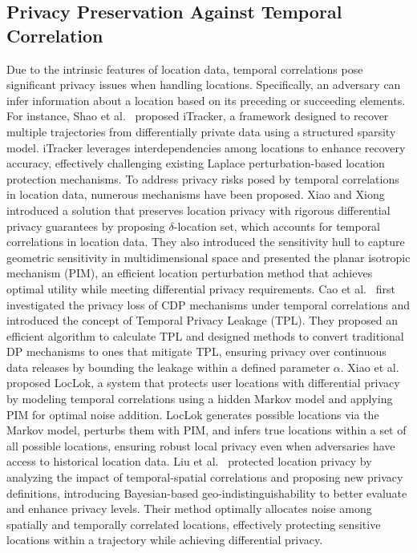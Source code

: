 \subsection{Privacy Preservation Against Temporal Correlation}
Due to the intrinsic features of location data, temporal correlations pose significant privacy issues when handling locations. Specifically, an adversary can infer information about a location based on its preceding or succeeding elements. For instance, Shao et al.~\cite{shao2020structured} proposed iTracker, a framework designed to recover multiple trajectories from differentially private data using a structured sparsity model. iTracker leverages interdependencies among locations to enhance recovery accuracy, effectively challenging existing Laplace perturbation-based location protection mechanisms.
To address privacy risks posed by temporal correlations in location data, numerous mechanisms have been proposed.
Xiao and Xiong~\cite{xiao2015protecting} introduced a solution that preserves location privacy with rigorous differential privacy guarantees by proposing $\delta$-location set, which accounts for temporal correlations in location data. They also introduced the sensitivity hull to capture geometric sensitivity in multidimensional space and presented the planar isotropic mechanism (PIM), an efficient location perturbation method that achieves optimal utility while meeting differential privacy requirements.
Cao et al.~\cite{cao2017quantifying} first investigated the privacy loss of CDP mechanisms under temporal correlations and introduced the concept of Temporal Privacy Leakage (TPL). They proposed an efficient algorithm to calculate TPL and designed methods to convert traditional DP mechanisms to ones that mitigate TPL, ensuring privacy over continuous data releases by bounding the leakage within a defined parameter $\alpha$.
Xiao et al.~\cite{xiao2017loclok} proposed LocLok, a system that protects user locations with differential privacy  by modeling temporal correlations using a hidden Markov model and applying PIM for optimal noise addition. LocLok generates possible locations via the Markov model, perturbs them with PIM, and infers true locations within a set of all possible locations, ensuring robust local privacy even when adversaries have access to historical location data.
Liu et al.~\cite{liu2019protecting} protected location privacy by analyzing the impact of temporal-spatial correlations and proposing new privacy definitions, introducing Bayesian-based geo-indistinguishability to better evaluate and enhance privacy levels. Their method optimally allocates noise among spatially and temporally correlated locations, effectively protecting sensitive locations within a trajectory while achieving differential privacy.
